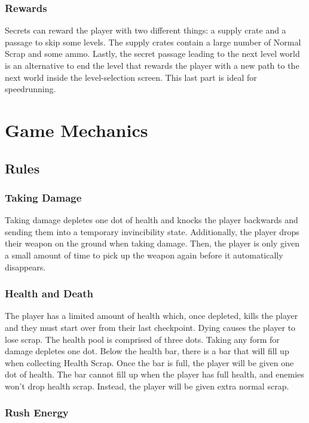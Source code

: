 \documentclass[12pt]{article}
\begin{document}
\subsubsection{Rewards}

Secrets can reward the player with two different things: a supply crate and a passage to skip some levels. The supply crates contain a large number of Normal Scrap and some ammo. Lastly, the secret passage leading to the next level world is an alternative to end the level that rewards the player with a new path to the next world inside the level-selection screen. This last part is ideal for speedrunning. 

\section{Game Mechanics}

\subsection{Rules}

\subsubsection{Taking Damage}

Taking damage depletes one dot of health and knocks the player backwards and sending them into a temporary invincibility state. Additionally, the player drops their weapon on the ground when taking damage. Then, the player is only given a small amount of time to pick up the weapon again before it automatically disappears. 

\subsubsection{Health and Death}

The player has a limited amount of health which, once depleted, kills the player and they must start over from their last checkpoint. Dying causes the player to lose scrap. The health pool is comprised of three dots. Taking any form for damage depletes one dot. Below the health bar, there is a bar that will fill up when collecting Health Scrap. Once the bar is full, the player will be given one dot of health. The bar cannot fill up when the player has full health, and enemies won't drop health scrap. Instead, the player will be given extra normal scrap. 

\subsubsection{Rush Energy}
\end{document}
